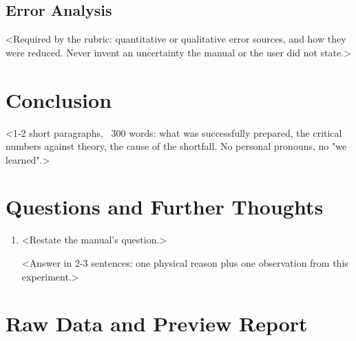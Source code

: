 \documentclass[12pt]{sustech-labreport}
\begin{document}
\subsection{Error Analysis}
<Required by the rubric: quantitative or qualitative error sources, and how
 they were reduced. Never invent an uncertainty the manual or the user did not
 state.>

\section{Conclusion}
<1-2 short paragraphs, ~300 words: what was successfully prepared, the
 critical numbers against theory, the cause of the shortfall. No personal
 pronouns, no "we learned".>

\section{Questions and Further Thoughts}
\begin{enumerate}
  \item <Restate the manual's question.>

  <Answer in 2-3 sentences: one physical reason plus one observation from this
  experiment.>
\end{enumerate}


\newpage
\section{Raw Data and Preview Report}
%
\end{document}
